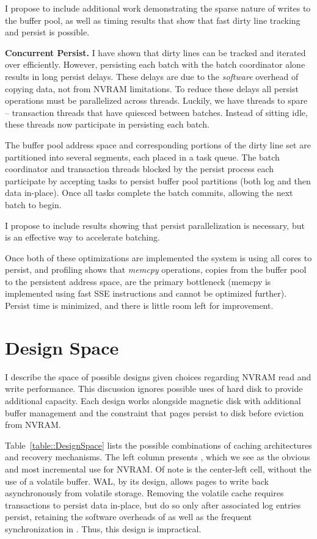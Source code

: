 I propose to include additional work demonstrating the sparse nature of writes to the buffer pool, as well as timing results that show that fast dirty line tracking and persist is possible.

\textbf{Concurrent Persist.}
I have shown that dirty lines can be tracked and iterated over efficiently.
However, persisting each batch with the batch coordinator alone results in long persist delays.
These delays are due to the \emph{software} overhead of copying data, not from NVRAM limitations.
To reduce these delays all persist operations must be parallelized across threads.
Luckily, we have threads to spare -- transaction threads that have quiesced between batches.
Instead of sitting idle, these threads now participate in persisting each batch.

The buffer pool address space and corresponding portions of the dirty line set are partitioned into several segments, each placed in a task queue.
The batch coordinator and transaction threads blocked by the persist process each participate by accepting tasks to persist buffer pool partitions (both log and then data in-place).
Once all tasks complete the batch commits, allowing the next batch to begin.

I propose to include results showing that persist parallelization is necessary, but is an effective way to accelerate batching.

Once both of these optimizations are implemented the system is using all cores to persist, and profiling shows that \emph{memcpy} operations, copies from the buffer pool to the persistent address space, are the primary bottleneck (memcpy is implemented using fast SSE instructions and cannot be optimized further).
Persist time is minimized, and there is little room left for improvement.

\section{Design Space}
\label{sec:OLTP_design:Designs}
I describe the space of possible designs given choices regarding NVRAM read and write performance.
This discussion ignores possible uses of hard disk to provide additional capacity.
Each design works alongside magnetic disk with additional buffer management and the constraint that pages persist to disk before eviction from NVRAM.

Table~\ref{table::DesignSpace} lists the possible combinations of caching architectures and recovery mechanisms.
The left column presents \NVDisk, which we see as the obvious and most incremental use for NVRAM.
Of note is the center-left cell, \NVDisk without the use of a volatile buffer.
WAL, by its design, allows pages to write back asynchronously from volatile storage.
Removing the volatile cache requires transactions to persist data in-place, but do so only after associated log entries persist, retaining the software overheads of \NVDisk as well as the frequent synchronization in \InPlace.
Thus, this design is impractical.

